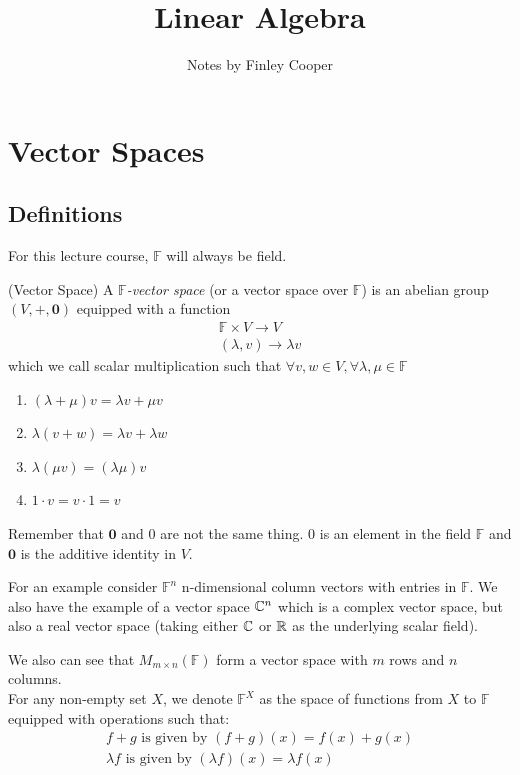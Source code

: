 \documentclass{article}
\title{Linear Algebra}
\author{Notes by Finley Cooper}
\newcommand{\F}{\mathbb{F}}
\begin{document}
  \maketitle
  \newpage
  \tableofcontents
  \newpage
  \section{Vector Spaces}
  \subsection{Definitions}
  For this lecture course, $ \F $ will always be field.
  \begin{definition}
	  (Vector Space) A $ \F $\textit{-vector space} (or a vector space over $ \F $) is an abelian group $ (V,+,\boldsymbol 0) $ equipped with a function
	  \begin{align*}
	    \F\times V\to V \\
	    (\lambda, v)\to \lambda v
	  \end{align*}
	  which we call scalar multiplication such that $ \forall v,w\in V, \forall \lambda,\mu\in\F $
	  \begin{enumerate} 
		  \item $ (\lambda + \mu)v=\lambda v + \mu v $
		  \item $ \lambda(v + w)=\lambda v + \lambda w $
		  \item $ \lambda(\mu v)=(\lambda \mu)v $
		  \item $ 1\cdot v = v\cdot 1 = v $
	  \end{enumerate}
  \end{definition}
  Remember that $ \boldsymbol 0 $ and $ 0 $ are not the same thing. $ 0 $ is an element in the field $ \F $ and $ \boldsymbol 0 $ is the additive identity in $ V $.\par
  For an example consider $ \F^n $ n-dimensional column vectors with entries in $ \F $. We also have the example of a vector space $ \mathbb{C}^n $ which is a complex vector space, but also a real vector space (taking either $ \mathbb{C} $ or $ \mathbb{R} $ as the underlying scalar field).\par
  We also can see that $ M_{m\times n}(\F) $ form a vector space with $ m $ rows and $ n $ columns.\\
  For any non-empty set $ X $, we denote $ \F^X $ as the space of functions from $ X $ to $ \F $ equipped with operations such that:
\begin{align*}
	f+g \text{ is given by } (f+g)(x)=f(x)+g(x)\\
	\lambda f \text{ is given by } (\lambda f)(x)=\lambda f(x)
\end{align*}
\end{document}
